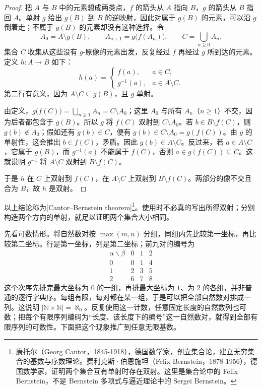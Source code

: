 \begin{proof}
	把 \(A\) 与 \(B\) 中的元素想成两类点，\(f\) 的箭头从 \(A\) 指向 \(B\)，\(g\) 的箭头从 \(B\) 指回 \(A\)。单射 \(g\) 给出 \(g(B)\) 到 \(B\) 的逆映射，因此对属于 \(g(B)\) 的元素，可以沿 \(g\) 倒着走；不属于 \(g(B)\) 的元素却没有这种选择。令
	\[
		A_0=A\setminus g(B),\qquad A_{n+1}=g\bigl(f(A_n)\bigr),\qquad C=\bigcup_{n\geq0}A_n.
	\]
	集合 \(C\) 收集从这些没有 \(g\)-原像的元素出发，反复经过 \(f\) 再经过 \(g\) 所到达的元素。定义 \(h:A\rightarrow B\) 如下：
	\[
		h(a)=
		\begin{cases}
			f(a),&a\in C,\\
			g^{-1}(a),&a\in A\setminus C.
		\end{cases}
	\]
	第二行有意义，因为 \(A\setminus C\subseteq g(B)\)，且 \(g\) 单射。

	由定义，\(g\bigl(f(C)\bigr)=\bigcup_{n\geq1}A_n=C\setminus A_0\)；这里 \(A_0\) 与所有 \(A_n\)（\(n\geq1\)）不交，因为后者都包含于 \(g(B)\)。所以 \(g\) 将 \(f(C)\) 双射到 \(C\setminus A_0\)。若 \(b\in B\setminus f(C)\)，则 \(g(b)\notin A_0\)；假如还有 \(g(b)\in C\)，便有 \(g(b)\in C\setminus A_0=g(f(C))\)。由 \(g\) 的单射性，这会推出 \(b\in f(C)\)，矛盾。因此 \(g(b)\in A\setminus C\)。反过来，若 \(a\in A\setminus C\)，它属于 \(g(B)\)，而 \(g^{-1}(a)\) 不能属于 \(f(C)\)，否则 \(a\in g(f(C))\subseteq C\)。这就说明 \(g^{-1}\) 将 \(A\setminus C\) 双射到 \(B\setminus f(C)\)。

	于是 \(h\) 在 \(C\) 上双射到 \(f(C)\)，在 \(A\setminus C\) 上双射到 \(B\setminus f(C)\)。两部分的像不交且合为 \(B\)，故 \(h\) 是双射。
\end{proof}

以上结论称为[Cantor--Bernstein theorem]\footnote{康托尔（Georg Cantor，1845-1918），德国数学家，创立集合论，建立无穷集合的基数与序数理论。费利克斯·伯恩施坦（Felix Bernstein，1878-1956），德国数学家，证明两个集合互有单射时存在双射。这里是集合论中的 Felix Bernstein，不是 Bernstein 多项式与逼近理论中的 Sergei Bernstein。}。使用时不必真的写出所得双射；分别构造两个方向的单射，就足以证明两个集合大小相同。

\ProseParagraphBreak
先看可数情形。将自然数对按 \(\max(m,n)\) 分组，同组内先比较第一坐标，再比较第二坐标。行是第一坐标，列是第二坐标；前九对的编号为
\[
	\begin{array}{c|ccc}
		\alpha\backslash\beta & 0 & 1 & 2 \\ \hline 0 & 0 & 1 & 4 \\
		1 & 2 & 3 & 5 \\
		2 & 6 & 7 & 8
	\end{array}
\]
这个次序先排完最大坐标为 \(0\) 的一组，再排最大坐标为 \(1\)、为 \(2\) 的各组，并非普通的逐行字典序。每组有限，每对都在某一组，于是可以把全部自然数对排成一列。这说明 \(\lvert\mathbb N\times\mathbb N\rvert=\aleph_0\)。反复使用这一计数，任意固定长度的自然数列也可数；把每个有限序列编码为“长度、该长度下的编号”这一自然数对，就得到全部有限序列的可数性。下面把这个现象推广到任意无限基数。

